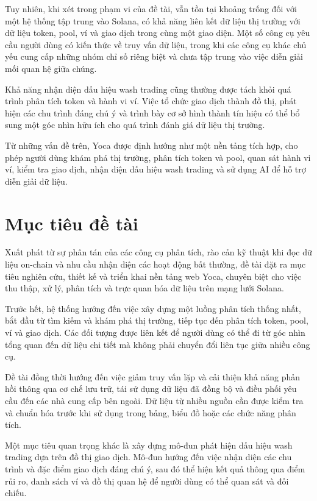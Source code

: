 Tuy nhiên, khi xét trong phạm vi của đề tài, vẫn tồn tại khoảng trống đối với một hệ thống tập trung vào Solana, có khả năng liên kết dữ liệu thị trường với dữ liệu token, pool, ví và giao dịch trong cùng một giao diện. Một số công cụ yêu cầu người dùng có kiến thức về truy vấn dữ liệu, trong khi các công cụ khác chủ yếu cung cấp những nhóm chỉ số riêng biệt và chưa tập trung vào việc diễn giải mối quan hệ giữa chúng.

Khả năng nhận diện dấu hiệu wash trading cũng thường được tách khỏi quá trình phân tích token và hành vi ví. Việc tổ chức giao dịch thành đồ thị, phát hiện các chu trình đáng chú ý và trình bày cơ sở hình thành tín hiệu có thể bổ sung một góc nhìn hữu ích cho quá trình đánh giá dữ liệu thị trường.

Từ những vấn đề trên, Yoca được định hướng như một nền tảng tích hợp, cho phép người dùng khám phá thị trường, phân tích token và pool, quan sát hành vi ví, kiểm tra giao dịch, nhận diện dấu hiệu wash trading và sử dụng AI để hỗ trợ diễn giải dữ liệu.

\section{Mục tiêu đề tài}
\label{sec:muc_tieu}

Xuất phát từ sự phân tán của các công cụ phân tích, rào cản kỹ thuật khi đọc dữ liệu on-chain và nhu cầu nhận diện các hoạt động bất thường, đề tài đặt ra mục tiêu nghiên cứu, thiết kế và triển khai nền tảng web Yoca, chuyên biệt cho việc thu thập, xử lý, phân tích và trực quan hóa dữ liệu trên mạng lưới Solana.

Trước hết, hệ thống hướng đến việc xây dựng một luồng phân tích thống nhất, bắt đầu từ tìm kiếm và khám phá thị trường, tiếp tục đến phân tích token, pool, ví và giao dịch. Các đối tượng được liên kết để người dùng có thể đi từ góc nhìn tổng quan đến dữ liệu chi tiết mà không phải chuyển đổi liên tục giữa nhiều công cụ.

Đề tài đồng thời hướng đến việc giảm truy vấn lặp và cải thiện khả năng phản hồi thông qua cơ chế lưu trữ, tái sử dụng dữ liệu đã đồng bộ và điều phối yêu cầu đến các nhà cung cấp bên ngoài. Dữ liệu từ nhiều nguồn cần được kiểm tra và chuẩn hóa trước khi sử dụng trong bảng, biểu đồ hoặc các chức năng phân tích.

Một mục tiêu quan trọng khác là xây dựng mô-đun phát hiện dấu hiệu wash trading dựa trên đồ thị giao dịch. Mô-đun hướng đến việc nhận diện các chu trình và đặc điểm giao dịch đáng chú ý, sau đó thể hiện kết quả thông qua điểm rủi ro, danh sách ví và đồ thị quan hệ để người dùng có thể quan sát và đối chiếu.

